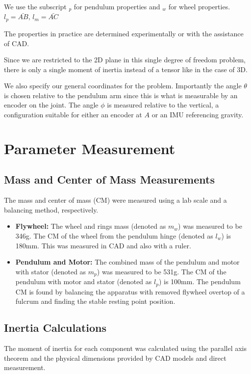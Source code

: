 \documentclass[11pt]{article}
\begin{document}
We use the subscript $_p$ for pendulum properties and $_w$ for wheel properties.
$l_p = \bar{AB}$, $l_m = \bar{AC}$

The properties in practice are determined experimentally or with the assistance of CAD.

Since we are restricted to the 2D plane in this single degree of freedom problem, there is only a single moment of inertia instead of a tensor like in the case of 3D.

We also specify our general coordinates for the problem. Importantly the angle $\theta$ is chosen relative to the pendulum arm since this is what is measurable by an encoder on the joint. The angle $\phi$ is measured relative to the vertical, a configuration suitable for either an encoder at $A$ or an IMU referencing gravity.

\section{Parameter Measurement}
\subsection{Mass and Center of Mass Measurements}
The mass and center of mass (CM) were measured using a lab scale and a balancing method, respectively.

\begin{itemize}
    \item \textbf{Flywheel:} The wheel and rings mass (denoted as \( m_w \)) was measured to be 346g. The CM of the wheel from the pendulum hinge (denoted as \( l_w \)) is 180mm. This was measured in CAD and also with a ruler.
    \item \textbf{Pendulum and Motor:} The combined mass of the pendulum and motor with stator (denoted as \( m_p \)) was measured to be 531g. The CM of the pendulum with motor and stator (denoted as \( l_p \)) is 100mm. The pendulum CM is found by balancing the apparatus with removed flywheel overtop of a fulcrum and finding the stable resting point position.
\end{itemize}

\subsection{Inertia Calculations}
The moment of inertia for each component was calculated using the parallel axis theorem and the physical dimensions provided by CAD models and direct measurement.
\end{document}
